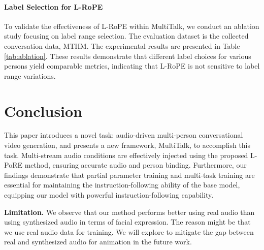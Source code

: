 \documentclass{article}
\begin{document}
\paragraph{Label Selection for L-RoPE}
To validate the effectiveness of L-RoPE within MultiTalk, we conduct an ablation study focusing on label range selection. The evaluation dataset is the collected conversation data, MTHM. The experimental results are presented in Table \ref{tab:ablation}. These results demonstrate that different label choices for various persons yield comparable metrics, indicating that L-RoPE is not sensitive to label range variations. 







\section{Conclusion}

This paper introduces a novel task: audio-driven multi-person conversational video generation, and presents a new framework, MultiTalk, to accomplish this task. Multi-stream audio conditions are effectively injected using the proposed L-PoRE method, ensuring accurate audio and person binding. Furthermore, our findings demonstrate that partial parameter training and multi-task training are essential for maintaining the instruction-following ability of the base model, equipping our model with powerful instruction-following capability.

\textbf{Limitation.} We observe that our method performs better using real audio than using synthesized audio in terms of facial expression. The reason might be that we use real audio data for training. We will explore to mitigate the gap between real and synthesized audio for animation in the future work.  
\end{document}

